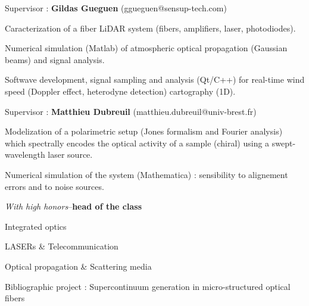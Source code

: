 \documentclass[9pt,a4paper,academicons]{altacv}
\begin{document}
\divider


Supervisor : \textbf{Gildas Gueguen} (ggueguen@sensup-tech.com)

\begin{cvlistdescription}
    \item Caracterization of a fiber LiDAR system (fibers, amplifiers, laser, photodiodes).
    \item Numerical simulation (Matlab) of atmospheric optical propagation (Gaussian beams) and signal analysis.
    \item Softwave development, signal sampling and analysis (Qt/C++) for real-time wind speed (Doppler effect, heterodyne detection) cartography (1D).
\end{cvlistdescription}

\divider


Supervisor : \textbf{Matthieu Dubreuil} (matthieu.dubreuil@univ-brest.fr)

\begin{cvlistdescription}
    \item Modelization of a polarimetric setup (Jones formalism and Fourier analysis) which spectrally encodes the optical activity of a sample (chiral) using a swept-wavelength laser source.
    \item Numerical simulation of the system (Mathematica) : sensibility to alignement errors and to noise sources.
\end{cvlistdescription}





\textit{With high honors}--\textbf{head of the class}
\begin{cvlistdescription}
    \item Integrated optics
    \item LASERs \& Telecommunication
    \item Optical propagation  \& Scattering media
    \item Bibliographic project : Supercontinuum generation in micro-structured optical fibers
\end{cvlistdescription}
\end{document}

